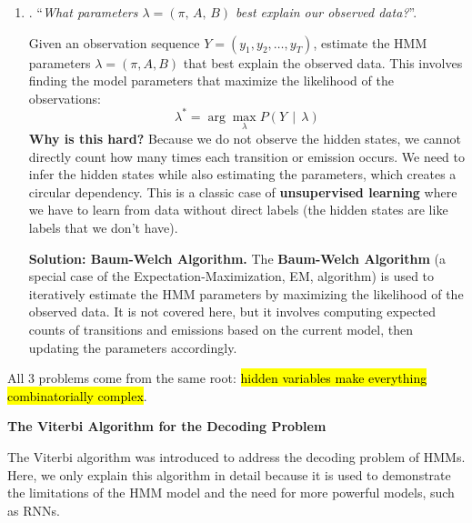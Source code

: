 \begin{enumerate}
    \textcolor{Green3}{ \textbf{Solution: Viterbi Algorithm.}} The \textbf{Viterbi Algorithm} is explained in detail later.


    \item {}. ``\emph{What parameters $\lambda = \left(\pi, \, A, \, B\right)$ best explain our observed data?}''.
    
    Given an observation sequence $Y = (y_1, y_2, \ldots, y_T)$, estimate the HMM parameters $\lambda = (\pi, A, B)$ that best explain the observed data. This involves finding the model parameters that maximize the likelihood of the observations:
    \begin{equation*}
        \lambda^* = \arg\max_{\lambda} P\left(Y \, \mid \, \lambda\right)
    \end{equation*}
    \textcolor{Red2}{ \textbf{Why is this hard?}} Because we do not observe the hidden states, we cannot directly count how many times each transition or emission occurs. We need to infer the hidden states while also estimating the parameters, which creates a circular dependency. This is a classic case of \textbf{unsupervised learning} where we have to learn from data without direct labels (the hidden states are like labels that we don't have).

    \textcolor{Green3}{ \textbf{Solution: Baum-Welch Algorithm.}} The \textbf{Baum-Welch Algorithm} (a special case of the Expectation-Maximization, EM, algorithm) is used to iteratively estimate the HMM parameters by maximizing the likelihood of the observed data. It is not covered here, but it involves computing expected counts of transitions and emissions based on the current model, then updating the parameters accordingly.
\end{enumerate}
All 3 problems come from the same root: \hl{hidden variables make everything combinatorially complex}.

\highspace
\begin{flushleft}
    \textcolor{Green3}{ \textbf{The Viterbi Algorithm for the Decoding Problem}}
\end{flushleft}
The Viterbi algorithm was introduced to address the decoding problem of HMMs. Here, we only explain this algorithm in detail because it is used to demonstrate the limitations of the HMM model and the need for more powerful models, such as RNNs.

